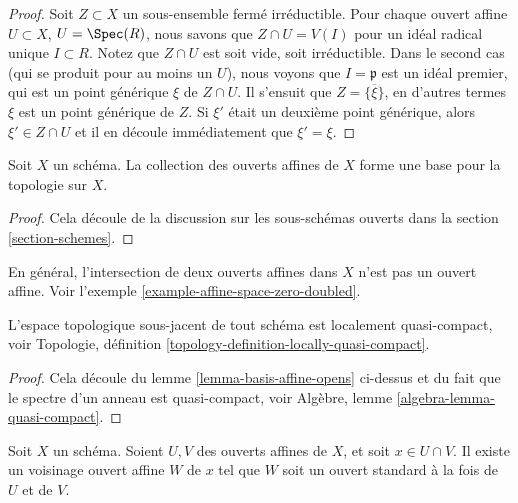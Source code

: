 \begin{proof}
Soit $Z \subset X$ un sous-ensemble fermé irréductible.
Pour chaque ouvert affine $U \subset X$, $U = \Spec(R)$,
nous savons que $Z \cap U = V(I)$ pour un idéal
radical unique $I \subset R$. Notez que $Z \cap U$ est soit vide,
soit irréductible. Dans le second cas (qui se produit pour
au moins un $U$), nous voyons que $I = \mathfrak p$ est
un idéal premier, qui est un point générique $\xi$ de $Z \cap U$. Il
s'ensuit que $Z = \overline{\{\xi\}}$, en d'autres termes $\xi$
est un point générique de $Z$. Si $\xi'$ était un deuxième
point générique, alors $\xi' \in Z \cap U$ et il en découle
immédiatement que $\xi' = \xi$.
\end{proof}

\begin{lemma}
\label{lemma-basis-affine-opens}
Soit $X$ un schéma. La collection des ouverts affines
de $X$ forme une base pour la topologie sur $X$.
\end{lemma}

\begin{proof}
Cela découle de la discussion sur les sous-schémas ouverts
dans la section \ref{section-schemes}.
\end{proof}

\begin{remark}
\label{remark-intersection-affine-opens}
En général, l'intersection de deux ouverts affines dans $X$
n'est pas un ouvert affine. Voir l'exemple \ref{example-affine-space-zero-doubled}.
\end{remark}

\begin{lemma}
\label{lemma-locally-quasi-compact}
L'espace topologique sous-jacent de tout schéma est
localement quasi-compact, voir
Topologie, définition \ref{topology-definition-locally-quasi-compact}.
\end{lemma}

\begin{proof}
Cela découle du lemme \ref{lemma-basis-affine-opens} ci-dessus
et du fait que le spectre d'un anneau est quasi-compact, voir
Algèbre, lemme \ref{algebra-lemma-quasi-compact}.
\end{proof}

\begin{lemma}
\label{lemma-standard-open-two-affines}
Soit $X$ un schéma.
Soient $U, V$ des ouverts affines de $X$, et soit $x \in U \cap V$.
Il existe un voisinage ouvert affine $W$ de $x$ tel que
$W$ soit un ouvert standard à la fois de $U$ et de $V$.
\end{lemma}

